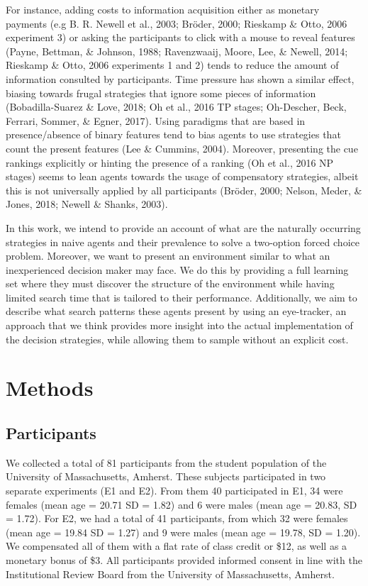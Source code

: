 \documentclass[
  english,
  man]{apa6}
\begin{document}
For instance, adding costs to information acquisition either as monetary payments (e.g B. R. Newell et al., 2003; Bröder, 2000; Rieskamp \& Otto, 2006 experiment 3) or asking the participants to click with a mouse to reveal features (Payne, Bettman, \& Johnson, 1988; Ravenzwaaij, Moore, Lee, \& Newell, 2014; Rieskamp \& Otto, 2006 experiments 1 and 2) tends to reduce the amount of information consulted by participants. Time pressure has shown a similar effect, biasing towards frugal strategies that ignore some pieces of information (Bobadilla-Suarez \& Love, 2018; Oh et al., 2016 TP stages; Oh-Descher, Beck, Ferrari, Sommer, \& Egner, 2017). Using paradigms that are based in presence/absence of binary features tend to bias agents to use strategies that count the present features (Lee \& Cummins, 2004). Moreover, presenting the cue rankings explicitly or hinting the presence of a ranking (Oh et al., 2016 NP stages) seems to lean agents towards the usage of compensatory strategies, albeit this is not universally applied by all participants (Bröder, 2000; Nelson, Meder, \& Jones, 2018; Newell \& Shanks, 2003).

In this work, we intend to provide an account of what are the naturally occurring strategies in naive agents and their prevalence to solve a two-option forced choice problem. Moreover, we want to present an environment similar to what an inexperienced decision maker may face. We do this by providing a full learning set where they must discover the structure of the environment while having limited search time that is tailored to their performance. Additionally, we aim to describe what search patterns these agents present by using an eye-tracker, an approach that we think provides more insight into the actual implementation of the decision strategies, while allowing them to sample without an explicit cost.

\hypertarget{methods}{%
\section{Methods}\label{methods}}

\hypertarget{participants}{%
\subsection{Participants}\label{participants}}

We collected a total of 81 participants from the student population of the University of Massachusetts, Amherst. These subjects participated in two separate experiments (E1 and E2). From them 40 participated in E1, 34 were females (mean age = 20.71 SD = 1.82) and 6 were males (mean age = 20.83, SD = 1.72). For E2, we had a total of 41 participants, from which 32 were females (mean age = 19.84 SD = 1.27) and 9 were males (mean age = 19.78, SD = 1.20). We compensated all of them with a flat rate of class credit or \$12, as well as a monetary bonus of \$3. All participants provided informed consent in line with the Institutional Review Board from the University of Massachusetts, Amherst.
\end{document}
